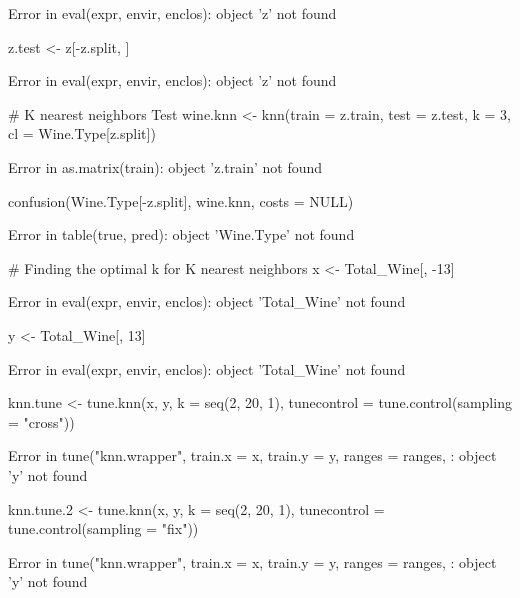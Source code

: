 \documentclass[letterpaper]{article}\usepackage[]{graphicx}\usepackage[]{color}
\begin{document}
\begin{Schunk}
\begin{Soutput}
Error in eval(expr, envir, enclos): object 'z' not found
\end{Soutput}
\begin{Sinput}
z.test <- z[-z.split, ]
\end{Sinput}
\begin{Soutput}
Error in eval(expr, envir, enclos): object 'z' not found
\end{Soutput}
\begin{Sinput}
# K nearest neighbors Test
wine.knn <- knn(train = z.train, test = z.test, k = 3, cl = Wine.Type[z.split])
\end{Sinput}
\begin{Soutput}
Error in as.matrix(train): object 'z.train' not found
\end{Soutput}
\begin{Sinput}
confusion(Wine.Type[-z.split], wine.knn, costs = NULL)
\end{Sinput}
\begin{Soutput}
Error in table(true, pred): object 'Wine.Type' not found
\end{Soutput}
\begin{Sinput}
# Finding the optimal k for K nearest neighbors
x <- Total_Wine[, -13]
\end{Sinput}
\begin{Soutput}
Error in eval(expr, envir, enclos): object 'Total_Wine' not found
\end{Soutput}
\begin{Sinput}
y <- Total_Wine[, 13]
\end{Sinput}
\begin{Soutput}
Error in eval(expr, envir, enclos): object 'Total_Wine' not found
\end{Soutput}
\begin{Sinput}
knn.tune <- tune.knn(x, y, k = seq(2, 20, 1), tunecontrol = tune.control(sampling = "cross"))
\end{Sinput}
\begin{Soutput}
Error in tune("knn.wrapper", train.x = x, train.y = y, ranges = ranges, : object 'y' not found
\end{Soutput}
\begin{Sinput}
knn.tune.2 <- tune.knn(x, y, k = seq(2, 20, 1), tunecontrol = tune.control(sampling = "fix"))
\end{Sinput}
\begin{Soutput}
Error in tune("knn.wrapper", train.x = x, train.y = y, ranges = ranges, : object 'y' not found
\end{Soutput}
\begin{Sinput}

\end{Sinput}
\end{Schunk}
\end{document}
